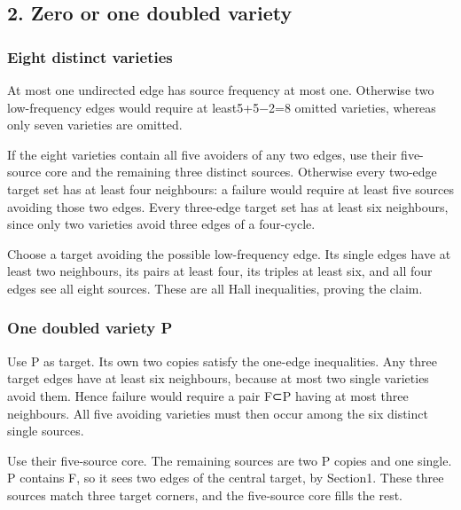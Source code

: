 \documentclass[
  10pt,
]{article}
\begin{document}
\hypertarget{zero-or-one-doubled-variety}{%
\subsection*{2. Zero or one doubled
variety}\label{zero-or-one-doubled-variety}}

\hypertarget{eight-distinct-varieties}{%
\subsubsection*{Eight distinct
varieties}\label{eight-distinct-varieties}}

At most one undirected edge has source frequency at most one. Otherwise
two low-frequency edges would require at least5+5−2=8 omitted varieties,
whereas only seven varieties are omitted.

If the eight varieties contain all five avoiders of any two edges, use
their five-source core and the remaining three distinct sources.
Otherwise every two-edge target set has at least four neighbours: a
failure would require at least five sources avoiding those two edges.
Every three-edge target set has at least six neighbours, since only two
varieties avoid three edges of a four-cycle.

Choose a target avoiding the possible low-frequency edge. Its single
edges have at least two neighbours, its pairs at least four, its triples
at least six, and all four edges see all eight sources. These are all
Hall inequalities, proving the claim.

\hypertarget{one-doubled-variety-p}{%
\subsubsection*{One doubled variety P}\label{one-doubled-variety-p}}

Use P as target. Its own two copies satisfy the one-edge inequalities.
Any three target edges have at least six neighbours, because at most two
single varieties avoid them. Hence failure would require a pair F⊂P
having at most three neighbours. All five avoiding varieties must then
occur among the six distinct single sources.

Use their five-source core. The remaining sources are two P copies and
one single. P contains F, so it sees two edges of the central target, by
Section1. These three sources match three target corners, and the
five-source core fills the rest.
\end{document}
